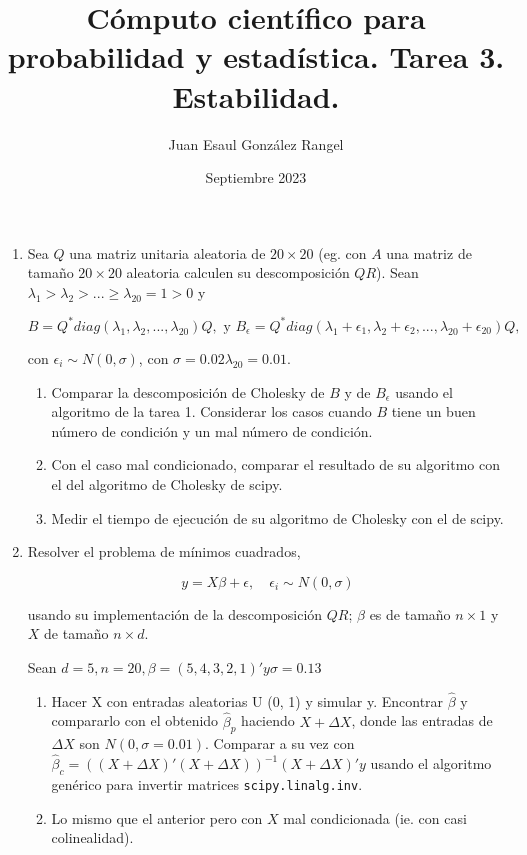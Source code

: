 \documentclass{article}
\title{Cómputo científico para probabilidad y estadística. Tarea 3.\\
Estabilidad.}
\author{Juan Esaul González Rangel}
\date{Septiembre 2023}
\begin{document}
\maketitle


\begin{enumerate}

    \item Sea $Q$ una matriz unitaria aleatoria de $20 \times 20$ (eg. con $A$ una 
    matriz de tamaño $20 \times 20$ aleatoria calculen su descomposición $QR$). 
    Sean $\lambda_1 > \lambda_2 > ... \ge \lambda_{20} = 1 > 0$ y 
    
    \[B = Q^*diag(\lambda_1, \lambda_2, ..., \lambda_{20})Q, \text{ y } B_\epsilon 
    = Q^*diag(\lambda_1+\epsilon_1, \lambda_2+\epsilon_2, ..., \lambda_{20}+\epsilon_{20})Q,\]

con $\epsilon_i \sim N (0, \sigma)$, con $\sigma = 0.02\lambda_{20} = 0.01$.

\begin{enumerate}
    \item Comparar la descomposición de Cholesky de $B$ y de $B_\epsilon$ usando el 
    algoritmo de la tarea 1. Considerar los casos cuando $B$ tiene un buen número de 
    condición y un mal número de condición.
    
    \item Con el caso mal condicionado, comparar el resultado de su algoritmo con 
    el del algoritmo de Cholesky de scipy.
    
    \item Medir el tiempo de ejecución de su algoritmo de Cholesky con el de scipy.
    
\end{enumerate}


    \item Resolver el problema de mínimos cuadrados,
    
        \[y = X\beta + \epsilon, \quad \epsilon_i \sim N (0, \sigma) \]

    usando su implementación de la descomposición $QR$; $\beta$ es de tamaño 
    $n \times 1$ y $X$ de tamaño $n \times d$.
    
    Sean $d = 5, n = 20, \beta = (5, 4, 3, 2, 1)' y \sigma = 0.13$

    \begin{enumerate}
        \item Hacer X con entradas aleatorias U (0, 1) y simular y. Encontrar $\hat\beta$
         y compararlo con el obtenido $\hat\beta_p$ haciendo $X + \Delta X$, donde las 
         entradas de $\Delta X$ son $N (0, \sigma = 0.01)$. Comparar a su vez con 
         $\hat\beta_c = ((X + \Delta X)'(X + \Delta X))^{-1}(X + \Delta X)'y$ usando el 
         algoritmo genérico para invertir matrices \texttt{scipy.linalg.inv}.
        \item Lo mismo que el anterior pero con $X$ mal condicionada (ie. con casi colinealidad).
    \end{enumerate}



   
\end{enumerate}




 
\end{document}
